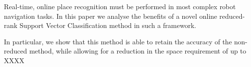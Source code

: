  Real-time, online place recognition must be performed in most
  complex robot navigation tasks. In this paper we analyse the
  benefits of a novel online reduced-rank Support Vector
  Classification method in such a framework.

  In particular, we show that this method is able to retain the
  accuracy of the non-reduced method, while allowing for a reduction
  in the space requirement of up to XXXX%